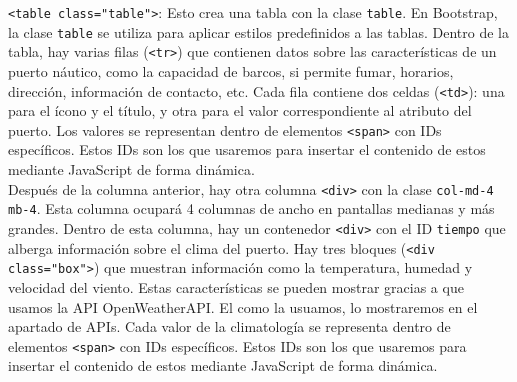 \documentclass{article}
\begin{document}
\noindent\texttt{<table class="table">}: Esto crea una tabla con la clase \texttt{table}. En Bootstrap, la clase \texttt{table} se utiliza para aplicar estilos predefinidos a las tablas. Dentro de la tabla, hay varias filas (\texttt{<tr>}) que contienen datos sobre las características de un puerto náutico, como la capacidad de barcos, si permite fumar, horarios, dirección, información de contacto, etc. Cada fila contiene dos celdas (\texttt{<td>}): una para el ícono y el título, y otra para el valor correspondiente al atributo del puerto. Los valores se representan dentro de elementos \texttt{<span>} con IDs específicos. Estos IDs son los que usaremos para insertar el contenido de estos mediante JavaScript de forma dinámica.\\

\noindent Después de la columna anterior, hay otra columna \texttt{<div>} con la clase \texttt{col-md-4 mb-4}. Esta columna ocupará 4 columnas de ancho en pantallas medianas y más grandes. Dentro de esta columna, hay un contenedor \texttt{<div>} con el ID \texttt{tiempo} que alberga información sobre el clima del puerto. Hay tres bloques (\texttt{<div class="box">}) que muestran información como la temperatura, humedad y velocidad del viento. Estas características se pueden mostrar gracias a que usamos la API OpenWeatherAPI. El como la usuamos, lo mostraremos en el apartado de APIs. Cada valor de la climatología se representa dentro de elementos \texttt{<span>} con IDs específicos. Estos IDs son los que usaremos para insertar el contenido de estos mediante JavaScript de forma dinámica.\\
\end{document}
